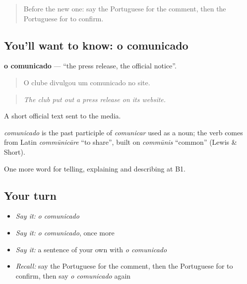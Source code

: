 \label{lesson:PT-C282-comunicado}



\begin{quote}
Before the new one: say the Portuguese for the comment, then the Portuguese for to confirm.
\end{quote}

\subsection*{You'll want to know: o comunicado}
\textbf{o comunicado} — \textquotedblleft{}the press release, the official notice\textquotedblright{}.

\begin{quote}
O clube divulgou um comunicado no site.
\end{quote}

\begin{quote}
\emph{The club put out a press release on its website.}
\end{quote}

A short official text sent to the media.

\begin{cousinweb}
\emph{comunicado} is the past participle of \emph{comunicar} used as a noun; the verb comes from Latin \emph{commūnicāre} \textquotedblleft{}to share\textquotedblright{}, built on \emph{commūnis} \textquotedblleft{}common\textquotedblright{} (Lewis \& Short).
\end{cousinweb}

\begin{grammarlens}[title={What you've built}]
One more word for telling, explaining and describing at B1.
\end{grammarlens}

\subsection*{Your turn}
\begin{itemize}
\raggedright
  \item \emph{Say it:} \emph{o comunicado}
  \item \emph{Say it:} \emph{o comunicado}, once more
  \item \emph{Say it:} a sentence of your own with \emph{o comunicado}
  \item \emph{Recall:} say the Portuguese for the comment, then the Portuguese for to confirm, then say \emph{o comunicado} again
\end{itemize}

